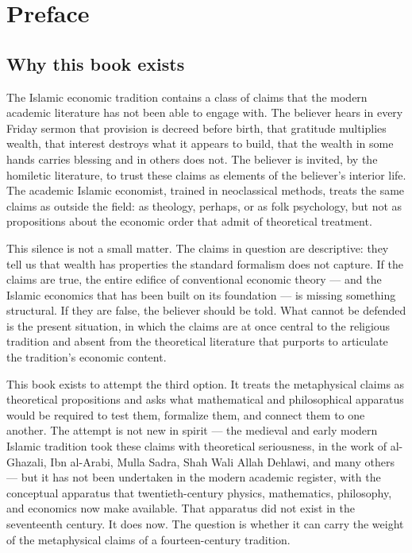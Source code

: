 \chapter*{Preface}

\section*{Why this book exists}

The Islamic economic tradition contains a class of claims that the
modern academic literature has not been able to engage with. The
believer hears in every Friday sermon that provision is decreed before
birth, that gratitude multiplies wealth, that interest destroys what it
appears to build, that the wealth in some hands carries blessing and in
others does not. The believer is invited, by the homiletic literature,
to trust these claims as elements of the believer's interior life. The
academic Islamic economist, trained in neoclassical methods, treats the
same claims as outside the field: as theology, perhaps, or as folk
psychology, but not as propositions about the economic order that admit
of theoretical treatment.

This silence is not a small matter. The claims in question are
descriptive: they tell us that wealth has properties the standard
formalism does not capture. If the claims are true, the entire edifice
of conventional economic theory --- and the Islamic economics that has
been built on its foundation --- is missing something structural. If
they are false, the believer should be told. What cannot be defended is
the present situation, in which the claims are at once central to the
religious tradition and absent from the theoretical literature that
purports to articulate the tradition's economic content.

This book exists to attempt the third option. It treats the
metaphysical claims as theoretical propositions and asks what
mathematical and philosophical apparatus would be required to test
them, formalize them, and connect them to one another. The attempt is
not new in spirit --- the medieval and early modern Islamic tradition
took these claims with theoretical seriousness, in the work of
al-Ghazali, Ibn al-Arabi, Mulla Sadra, Shah Wali Allah Dehlawi, and
many others --- but it has not been undertaken in the modern academic
register, with the conceptual apparatus that twentieth-century physics,
mathematics, philosophy, and economics now make available. That
apparatus did not exist in the seventeenth century. It does now. The
question is whether it can carry the weight of the metaphysical claims
of a fourteen-century tradition.

